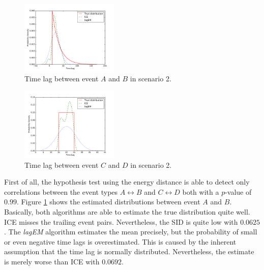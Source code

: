\documentclass[conference]{IEEEtran}
\theoremstyle{examplestyle}
\newcommand\imgsize{0.415}
\begin{document}
\begin{figure}[!tb]
	\centering
	\includegraphics[width=\imgsize\textwidth]{images/scenarios/2-AB.pdf}
	\caption{Time lag between event \(A\) and \(B\) in scenario 2.}
	\label{fig:scen2-1}	
\end{figure}

\begin{figure}[!tb]
	\centering
	\includegraphics[width=\imgsize\textwidth]{images/scenarios/2-CD.pdf}
	\caption{Time lag between event \(C\) and \(D\) in scenario 2.}
	\label{fig:scen2-2}	
\end{figure}

First of all, the hypothesis test using the energy distance is able to detect only correlations between the event types \(A \leftrightarrow B\) and \(C \leftrightarrow D\) both with a \(p\)-value of $0.99$. Figure \ref{fig:scen2-1} shows the estimated distributions between event \(A\) and \(B\). Basically, both algorithms are able to estimate the true distribution quite well. \ac{ICE} misses the trailing event pairs. Nevertheless, the \ac{SID} is quite low with $0.0625$. The \textit{lagEM} algorithm estimates the mean precisely, but the probability of small or even negative time lags is overestimated. This is caused by the inherent assumption that the time lag is normally distributed. Nevertheless, the estimate is merely worse than \ac{ICE} with $0.0692$.
\end{document}
